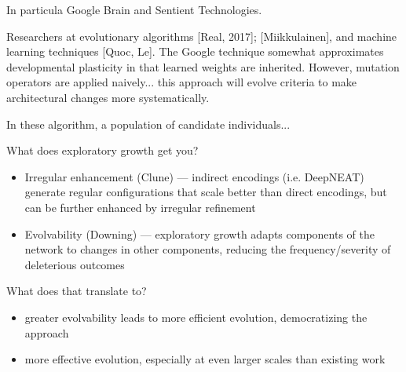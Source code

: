 In particula Google Brain and Sentient Technologies.

Researchers at
  evolutionary algorithms [Real, 2017]; [Miikkulainen], and machine learning techniques [Quoc, Le].
The Google technique somewhat approximates developmental plasticity in that learned weights are inherited.
However, mutation operators are applied naively... this approach will evolve criteria to make architectural changes more systematically.



In these algorithm, a population of candidate individuals...

What does exploratory growth get you?
\begin{itemize}
\item Irregular enhancement (Clune) --- indirect encodings (i.e. DeepNEAT) generate regular configurations that scale better than direct encodings, but can be further enhanced by irregular refinement
\item Evolvability (Downing) --- exploratory growth adapts components of the network to changes in other components, reducing the frequency/severity of deleterious outcomes
\end{itemize}

What does that translate to?
\begin{itemize}
Existing evolutionary techniques require astronomical, and generally prohibitive, computational cost.
Real et al. report using on the order of $2 \times 10^{20}$ FLOPS.
\item greater evolvability leads to more efficient evolution, democratizing the approach
\item more effective evolution, especially at even larger scales than existing work
\end{itemize}
